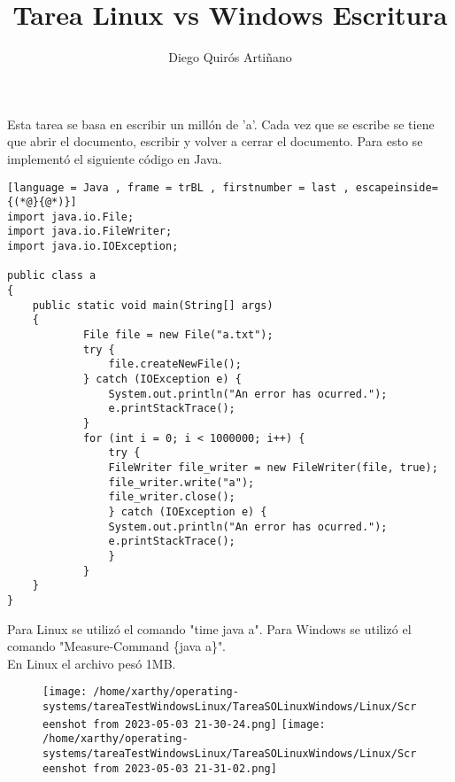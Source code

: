 \documentclass[10pt, article, natbib]{IEEEtran}
\title{Tarea Linux vs Windows Escritura}
\author{Diego Quirós Artiñano}
\begin{document}
\maketitle
\thispagestyle{fancy}

Esta tarea se basa en escribir un millón de 'a'. Cada vez que se escribe se tiene que abrir el documento, escribir y volver a cerrar el documento. Para esto se implementó el siguiente código en Java.

\begin{lstlisting}[language = Java , frame = trBL , firstnumber = last , escapeinside={(*@}{@*)}]
import java.io.File;
import java.io.FileWriter;
import java.io.IOException;

public class a
{
    public static void main(String[] args)
    {   
    		File file = new File("a.txt");
    		try {
    			file.createNewFile();
    		} catch (IOException e) {
    			System.out.println("An error has ocurred.");
    			e.printStackTrace();
    		}
    		for (int i = 0; i < 1000000; i++) {
    			try {
				FileWriter file_writer = new FileWriter(file, true);
				file_writer.write("a");
				file_writer.close();    			
    			} catch (IOException e) {
				System.out.println("An error has ocurred.");
				e.printStackTrace();    			
    			}
    		}
    }
}
\end{lstlisting}


Para Linux se utilizó el comando "time java a". Para Windows se utilizó el comando "Measure-Command \{java a\}".\\

En Linux el archivo pesó 1MB.
\begin{figure} [h]
\texttt{[image: /home/xarthy/operating-systems/tareaTestWindowsLinux/TareaSOLinuxWindows/Linux/Screenshot from 2023-05-03 21-30-24.png]}
\texttt{[image: /home/xarthy/operating-systems/tareaTestWindowsLinux/TareaSOLinuxWindows/Linux/Screenshot from 2023-05-03 21-31-02.png]}
\end{figure}
\end{document}
